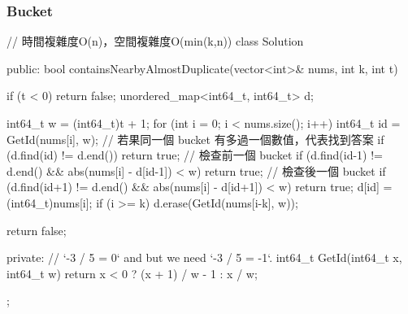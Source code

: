 \subsubsection{Bucket}
\begin{Code}
// 時間複雜度O(n)，空間複雜度O(min(k,n))
class Solution {
public:
    bool containsNearbyAlmostDuplicate(vector<int>& nums, int k, int t) {
        if (t < 0) return false;
        unordered_map<int64_t, int64_t> d;

        int64_t w = (int64_t)t + 1;
        for (int i = 0; i < nums.size(); i++)
        {
            int64_t id = GetId(nums[i], w);
            // 若果同一個 bucket 有多過一個數值，代表找到答案
            if (d.find(id) != d.end())
                return true;
            // 檢查前一個 bucket
            if (d.find(id-1) != d.end() && abs(nums[i] - d[id-1]) < w)
                return true;
            // 檢查後一個 bucket
            if (d.find(id+1) != d.end() && abs(nums[i] - d[id+1]) < w)
                return true;
            d[id] = (int64_t)nums[i];
            if (i >= k) d.erase(GetId(nums[i-k], w));
        }

        return false;
    }
private:
    // `-3 / 5 = 0` and but we need `-3 / 5 = -1`.
    int64_t GetId(int64_t x, int64_t w)
    {
        return x < 0 ? (x + 1) / w - 1 : x / w;
    }
};
\end{Code}
